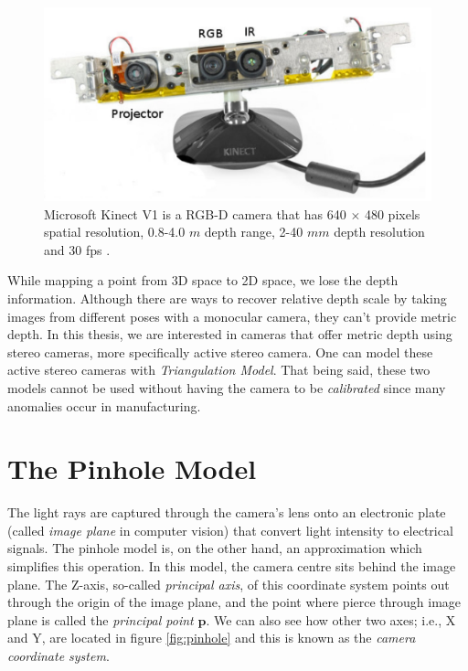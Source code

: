\documentclass[a4paper]{report}
\numberwithin{figure}{section}
\begin{document}
\begin{figure}[H]
	\centering
	\includegraphics[width=0.65\linewidth,natwidth=640,natheight=640]
	{fig/ref_imgs/kinect_pic.png}
  \caption[Microsoft Kinect V1]{Microsoft Kinect V1 is a RGB-D camera that has 
  640 $\times$ 480 pixels spatial resolution, 0.8-4.0 $m$ depth range, 2-40 
  $mm$ depth resolution and 30 fps \parencite{Smisek2011}.}
	\label{fig:kinect_pic}
\end{figure}

While mapping a point from 3D space to 2D space, we lose the 
depth information.  Although there are ways to recover relative depth scale by 
taking images from different poses with a monocular camera, they can't provide 
metric depth.  In this thesis, we are interested in cameras that offer metric 
depth using stereo cameras, more specifically active stereo camera. One can 
model these active stereo cameras with \textit{Triangulation Model}. That 
being said, these two models cannot be used without having the camera to be 
\textit{calibrated} since many anomalies occur in manufacturing.


\section{The Pinhole Model} \label{sc_pinhole}

The light rays are captured through the camera's lens onto an electronic plate 
(called \textit{image plane} in computer vision) that convert light intensity 
to electrical signals.  The pinhole model is, on the other hand, an 
approximation which simplifies this operation.  In this model, the camera 
centre sits behind the image plane.  The Z-axis, so-called \textit{principal 
axis}, of this coordinate system points out through the origin of the image 
plane, and the point where pierce through image plane is called the 
\textit{principal point} $\mathbf{p}$.  We can also see how other two axes; 
i.e., X and Y, are located in figure \ref{fig:pinhole} and this is known as 
the \textit{camera coordinate system}.
\end{document}
